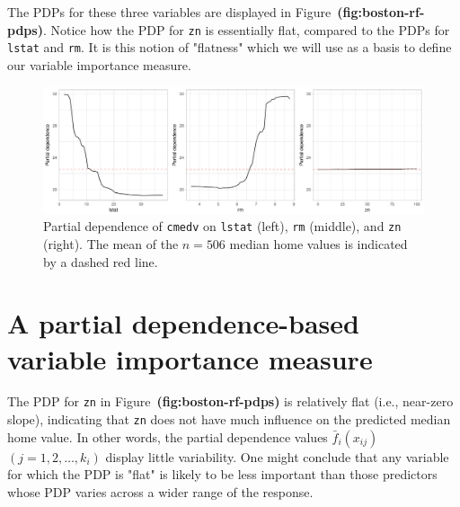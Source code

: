 \documentclass[12pt]{article}
\def\code#1{\texttt{#1}}
\def\ref#1{\textbf{(#1)}}
\begin{document}
The PDPs for these three variables are displayed in Figure~\ref{fig:boston-rf-pdps}. Notice how the PDP for \code{zn} is essentially flat, compared to the PDPs for \code{lstat} and \code{rm}. It is this notion of "flatness" which we will use as a basis to define our variable importance measure.
\begin{figure}[!htb]
  \centering
  \includegraphics[width=1.0\textwidth]{boston-rf-pdps}
  \caption{Partial dependence of \code{cmedv} on \code{lstat} (left), \code{rm} (middle), and \code{zn} (right). The mean of the $n = 506$ median home values is indicated by a dashed red line. \label{fig:boston-rf-pdps}}
\end{figure}


\section{A partial dependence-based variable importance measure}
\label{sec:new}

The PDP for \code{zn} in Figure~\ref{fig:boston-rf-pdps} is relatively flat (i.e., near-zero slope), indicating that \code{zn} does not have much influence on the predicted median home value. In other words, the partial dependence values $\bar{f}_i\left(x_{ij}\right)$ $\left(j = 1, 2, \dots, k_i\right)$ display little variability. One might conclude that any variable for which the PDP is "flat" is likely to be less important than those predictors whose PDP varies across a wider range of the response.
\end{document}
